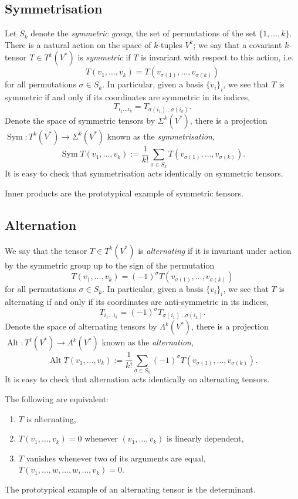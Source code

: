 
\subsection{Symmetrisation}

Let $S_k$ denote the \emph{symmetric group}, the set of permutations of the set $\{1, \dots, k\}$. There is a natural action on the space of $k$-tuples $V^k$; we say that a covariant $k$-tensor $T \in T^k (V^*)$ is \emph{symmetric} if $T$ is invariant with respect to this action, i.e.
	\[ T(v_1, \dots, v_k) = T(v_{\sigma(1)}, \dots, v_{\sigma(k)}) \]
for all permutations $\sigma \in S_k$. In particular, given a basis $\{v_i\}_i$, we see that $T$ is symmetric if and only if its coordinates are symmetric in its indices, 
	\[ T_{i_1 \dots i_k} = T_{\sigma(i_1) \dots \sigma(i_k)}. \]
Denote the space of symmetric tensors by $\Sigma^k (V^*)$, there is a projection $\operatorname{Sym} : T^k (V^*) \to \Sigma^k (V^*)$ known as the \emph{symmetrisation},
	\[ \operatorname{Sym} T (v_1, \dots, v_k) := \frac{1}{k !} \sum_{\sigma \in S_k} T(v_{\sigma(1)}, \dots, v_{\sigma(k)}). \]
It is easy to check that symmetrisation acts identically on symmetric tensors. 

\begin{example}
	Inner products are the prototypical example of symmetric tensors. 
\end{example}

\subsection{Alternation}

We say that the tensor $T \in T^k (V^*)$ is \emph{alternating} if it is invariant under action by the symmetric group up to the sign of the permutation 
	\[ T(v_1, \dots, v_k) = (-1)^\sigma T(v_{\sigma(1)}, \dots, v_{\sigma(k)}) \]
for all permutations $\sigma \in S_k$. In particular, given a basis $\{v_i\}_i$, we see that $T$ is alternating if and only if its coordinates are anti-symmetric in its indices, 
	\[ T_{i_1 \dots i_k} = (-1)^\sigma T_{\sigma(i_1) \dots \sigma(i_k)}. \]
Denote the space of alternating tensors by $\Lambda^k (V^*)$, there is a projection $\operatorname{Alt} : T^\ell (V^*) \to \Lambda^k (V^*)$ known as the \emph{alternation},
	\[ \operatorname{Alt} T (v_1, \dots, v_k) := \frac{1}{k !} \sum_{\sigma \in S_k} (-1)^\sigma T(v_{\sigma(1)}, \dots, v_{\sigma(k)}). \]
It is easy to check that alternation acts identically on alternating tensors. 

\begin{remark}
	The following are equivalent:
	\begin{enumerate}
		\item $T$ is alternating, 
		\item $T(v_1, \dots, v_k) =0$ whenever $(v_1, \dots, v_k)$ is linearly dependent, 
		\item $T$ vanishes whenever two of its arguments are equal, $T(v_1, \dots, w, \dots, w, \dots, v_k) = 0$. 
	\end{enumerate}
\end{remark}

\begin{example}
	The prototypical example of an alternating tensor is the determinant. 
\end{example}
